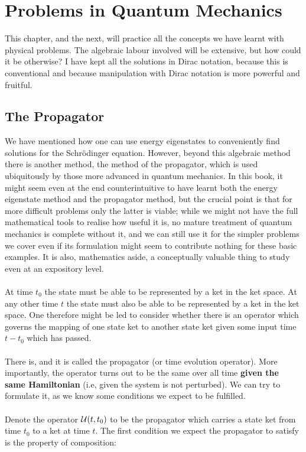 \chapter{Problems in Quantum Mechanics}
This chapter, and the next, will practice all the concepts we have learnt with physical problems. The algebraic labour involved will be extensive, but how could it be otherwise? I have kept all the solutions in Dirac notation, because this is conventional and because manipulation with Dirac notation is more powerful and fruitful. 
\section{The Propagator}
We have mentioned how one can use energy eigenstates to conveniently find solutions for the Schr\"{o}dinger equation. However, beyond this algebraic method there is another method, the method of the propagator, which is used ubiquitously by those more advanced in quantum mechanics. In this book, it might seem even at the end counterintuitive to have learnt both the energy eigenstate method and the propagator method, but the crucial point is that for more difficult problems only the latter is viable; while we might not have the full mathematical tools to realise how useful it is, no mature treatment of quantum mechanics is complete without it, and we can still use it for the simpler problems we cover even if its formulation might seem to contribute nothing for these basic examples. It is also, mathematics aside, a conceptually valuable thing to study even at an expository level.
\\\\
At time $t_{0}$ the state must be able to be represented by a ket in the ket space. At any other time $t$ the state must also be able to be represented by a ket in the ket space. One therefore might be led to consider whether there is an operator which governs the mapping of one state ket to another state ket given some input time $t-t_{0}$ which has passed.
\\\\
There is, and it is called the propagator (or time evolution operator). More importantly, the operator turns out to be the same over all time \textbf{given the same Hamiltonian} (i.e, given the system is not perturbed). We can try to formulate it, as we know some conditions we expect to be fulfilled.
\\\\
Denote the operator $\mathcal{U}(t,t_{0})$ to be the propagator which carries a state ket from time $t_{0}$ to a ket at time $t$. The first condition we expect the propagator to satisfy is the property of composition:
